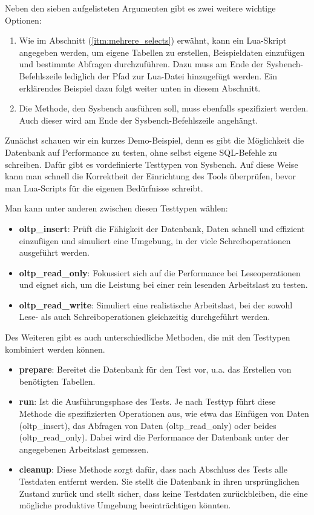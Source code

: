 Neben den sieben aufgelisteten Argumenten gibt es zwei weitere wichtige Optionen:
\begin{enumerate}
    \item Wie im Abschnitt (\ref{itm:mehrere_selects}) erwähnt, kann ein Lua-Skript angegeben werden, um eigene
    Tabellen zu erstellen, Beispieldaten einzufügen und bestimmte Abfragen durchzuführen.
    Dazu muss am Ende der Sysbench-Befehlszeile lediglich der Pfad zur Lua-Datei hinzugefügt werden.
    Ein erklärendes Beispiel dazu folgt weiter unten in diesem Abschnitt.
    \item Die Methode, den Sysbench ausführen soll, muss ebenfalls spezifiziert werden.
    Auch dieser wird am Ende der Sysbench-Befehlszeile angehängt.
\end{enumerate}

Zunächst schauen wir ein kurzes Demo-Beispiel, denn es gibt die Möglichkeit die Datenbank
auf Performance zu testen, ohne selbst eigene SQL-Befehle zu schreiben. Dafür gibt es vordefinierte Testtypen von Sysbench.
Auf diese Weise kann man schnell die Korrektheit der Einrichtung des Tools überprüfen, bevor man Lua-Scripts
für die eigenen Bedürfnisse schreibt.

Man kann unter anderen zwischen diesen Testtypen wählen:
\begin{itemize}
    \item \textbf{oltp\_insert}: Prüft die Fähigkeit der Datenbank, Daten schnell und effizient einzufügen und
    simuliert eine Umgebung, in der viele Schreiboperationen ausgeführt werden.
    \item \textbf{oltp\_read\_only}: Fokussiert sich auf die Performance bei Leseoperationen und
    eignet sich, um die Leistung bei einer rein lesenden Arbeitslast zu testen.
    \item \textbf{oltp\_read\_write}: Simuliert eine realistische Arbeitslast, bei der sowohl Lese- als
    auch Schreiboperationen gleichzeitig durchgeführt werden.
\end{itemize}

Des Weiteren gibt es auch unterschiedliche Methoden, die mit den Testtypen kombiniert werden können.

\begin{itemize}
    \item \textbf{prepare}: Bereitet die Datenbank für den Test vor, u.a. das Erstellen von benötigten Tabellen.
    \item \textbf{run}: Ist die Ausführungsphase des Tests. Je nach Testtyp führt diese Methode die spezifizierten Operationen aus,
    wie etwa das Einfügen von Daten (oltp\_insert), das Abfragen von Daten (oltp\_read\_only) oder beides (oltp\_read\_only).
    Dabei wird die Performance der Datenbank unter der angegebenen Arbeitslast gemessen.
    \item \textbf{cleanup}: Diese Methode sorgt dafür, dass nach Abschluss des Tests alle Testdaten entfernt werden.
    Sie stellt die Datenbank in ihren ursprünglichen Zustand zurück und stellt sicher,
    dass keine Testdaten zurückbleiben, die eine mögliche produktive Umgebung beeinträchtigen könnten.
\end{itemize}

